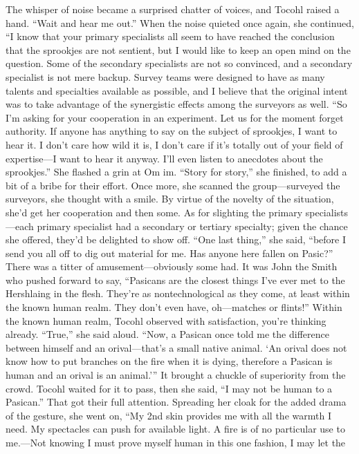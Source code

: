 \documentclass[9pt]{article}
\begin{document}
The whisper of noise became a surprised chatter of voices, and Tocohl raised a hand. “Wait and hear me
out.”
When the noise quieted once again, she continued, “I know that your primary specialists all seem to
have reached the conclusion that the sprookjes are not sentient, but I would like to keep an open mind
on the question. Some of the secondary specialists are not so convinced, and a secondary specialist is
not mere backup. Survey teams were designed to have as many talents and specialties available as
possible, and I believe that the original intent was to take advantage of the synergistic effects among the
surveyors as well.
“So I’m asking for your cooperation in an experiment. Let us for the moment forget authority. If
anyone has anything to say on the subject of sprookjes, I want to hear it. I don’t care how wild it is, I
don’t care if it’s totally out of your field of expertise—I want to hear it anyway. I’ll even listen to
anecdotes about the sprookjes.” She flashed a grin at Om im. “Story for story,” she finished, to add a bit
of a bribe for their effort.
Once more, she scanned the group—surveyed the surveyors, she thought with a smile. By virtue of
the novelty of the situation, she’d get her cooperation and then some. As for slighting the primary
specialists—each primary specialist had a secondary or tertiary specialty; given the chance she offered,
they’d be delighted to show off.
“One last thing,” she said, “before I send you all off to dig out material for me. Has anyone here fallen
on Pasic?”
There was a titter of amusement—obviously some had.
It was John the Smith who pushed forward to say, “Pasicans are the closest things I’ve ever met to
the Hershlaing in the flesh. They’re as nontechnological as they come, at least within the known human
realm. They don’t even have, oh—matches or flints!”
Within the known human realm, Tocohl observed with satisfaction, you’re thinking already.
“True,” she said aloud. “Now, a Pasican once told me the difference between himself and an
orival—that’s a small native animal. ‘An orival does not know how to put branches on the fire when it is
dying, therefore a Pasican is human and an orival is an animal.’”
It brought a chuckle of superiority from the crowd. Tocohl waited for it to pass, then she said, “I may
not be human to a Pasican.”
That got their full attention. Spreading her cloak for the added drama of the gesture, she went on,
“My 2nd skin provides me with all the warmth I need. My spectacles can push for available light. A fire is
of no particular use to me.—Not knowing I must prove myself human in this one fashion, I may let the
\end{document}

